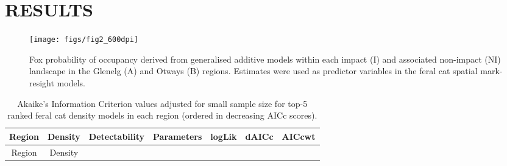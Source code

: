 \documentclass[]{elsarticle} %
\begin{document}
\newpage

\hypertarget{results}{%
\section{RESULTS}\label{results}}

\begin{figure}
\texttt{[image: figs/fig2\_600dpi]} \caption{Fox probability of occupancy derived from generalised additive models within each impact (I) and associated non-impact (NI) landscape in the Glenelg (A) and Otways (B) regions. Estimates were used as predictor variables in the feral cat spatial mark-resight models.}\label{fig:foxplot}
\end{figure}

\newpage

\begin{longtable}[]{@{}ccccccc@{}}
\caption{\label{tab:aictab} Akaike's Information Criterion values adjusted for small sample size for top-5 ranked feral cat density models in each region (ordered in decreasing AICc scores).}\tabularnewline
\toprule
\begin{minipage}[b]{0.09\columnwidth}\centering
Region\strut
\end{minipage} & \begin{minipage}[b]{0.20\columnwidth}\centering
Density\strut
\end{minipage} & \begin{minipage}[b]{0.15\columnwidth}\centering
Detectability\strut
\end{minipage} & \begin{minipage}[b]{0.12\columnwidth}\centering
Parameters\strut
\end{minipage} & \begin{minipage}[b]{0.08\columnwidth}\centering
logLik\strut
\end{minipage} & \begin{minipage}[b]{0.07\columnwidth}\centering
dAICc\strut
\end{minipage} & \begin{minipage}[b]{0.08\columnwidth}\centering
AICcwt\strut
\end{minipage}\tabularnewline
\midrule
\endfirsthead
\toprule
\begin{minipage}[b]{0.09\columnwidth}\centering
Region\strut
\end{minipage} & \begin{minipage}[b]{0.20\columnwidth}\centering
Density\strut
\end{minipage} & \begin{minipage}[b]{0.15\columnwidth}\centering

\end{minipage}
\end{longtable}
\end{document}
